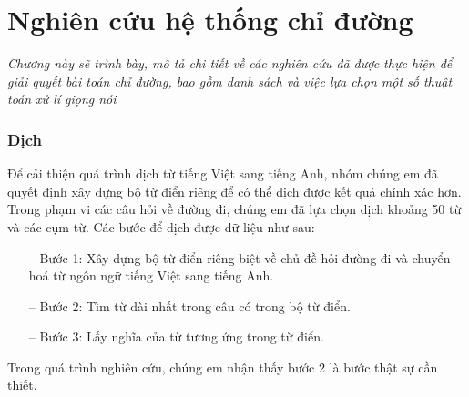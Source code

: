 \chapter{Nghiên cứu hệ thống chỉ đường}
\label{Chapter3}

\emph{Chương này sẽ trình bày, mô tả chi tiết về các nghiên cứu đã được thực hiện để giải quyết bài toán chỉ đường, bao gồm danh sách và việc lựa chọn một số thuật toán xử lí giọng nói}
\subsection{Dịch}
Để cải thiện quá trình dịch từ tiếng Việt sang tiếng Anh, nhóm chúng em đã quyết định xây dựng bộ từ điển riêng để có thể dịch được kết quả chính xác hơn.
Trong phạm vi các câu hỏi về đường đi, chúng em đã lựa chọn dịch khoảng 50 từ và các cụm từ. Các bước để dịch được dữ liệu như sau:
\begin{itemize}
    \item[--] Bước 1: Xây dựng bộ từ điển riêng biệt về chủ đề hỏi đường đi và chuyển hoá từ ngôn ngữ tiếng Việt sang tiếng Anh.
    \item[--] Bước 2: Tìm từ dài nhất trong câu có trong bộ từ điển.
    \item[--] Bước 3: Lấy nghĩa của từ tương ứng trong từ điển.
\end{itemize}
Trong quá trình nghiên cứu, chúng em nhận thấy bước 2 là bước thật sự cần thiết.